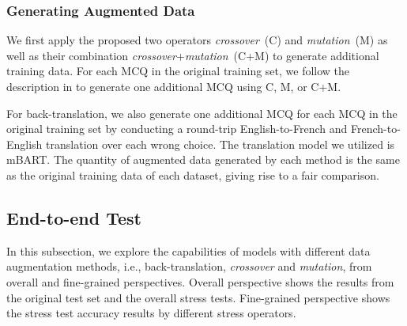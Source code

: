\subsubsection{Generating Augmented Data}
We first apply the proposed two operators \textit{crossover}~(C) and \textit{mutation}~(M) as well as their combination \textit{crossover}+\textit{mutation}~(C+M) to generate additional training data. For each MCQ in the original training set, we follow the description in  to generate one additional MCQ using C, M, or C+M. 

For back-translation, we also generate one additional MCQ for each MCQ in the original training set by conducting a round-trip English-to-French and French-to-English translation over each wrong choice. The translation model we utilized is mBART. The quantity of augmented data generated by each method is the same as the original training data of each dataset, giving rise to a fair comparison.

\subsection{End-to-end Test}
In this subsection, we explore the capabilities of models with 
different data augmentation methods, i.e., back-translation, \textit{crossover} and 
\textit{mutation}, from overall and fine-grained perspectives. 
Overall perspective shows the results from the original test set and 
the overall stress tests. Fine-grained perspective shows the stress test accuracy 
results by different stress operators.


